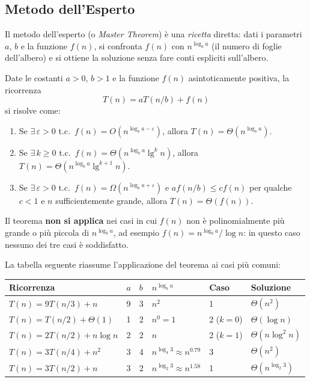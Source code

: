 \subsection{Metodo dell'Esperto}

\begin{softnote}
	Il metodo dell'esperto (o \emph{Master Theorem}) è una \emph{ricetta} diretta: dati i parametri
	$a$, $b$ e la funzione $f(n)$, si confronta $f(n)$ con $n^{\log_b a}$ (il numero di foglie dell'albero)
	e si ottiene la soluzione senza fare conti espliciti sull'albero.
\end{softnote}

\begin{teorema}
	Date le costanti $a > 0$, $b > 1$ e la funzione $f(n)$ asintoticamente positiva, la ricorrenza
	\[
	T(n) = aT(n/b) + f(n)
	\]
	si risolve come:
	\begin{enumerate}
		\item Se $\exists\,\varepsilon > 0$ t.c.\ $f(n) = O\!\left(n^{\log_b a - \varepsilon}\right)$, allora $T(n) = \Theta(n^{\log_b a})$.
		\item Se $\exists\,k \geq 0$ t.c.\ $f(n) = \Theta\!\left(n^{\log_b a} \lg^k n\right)$, allora $T(n) = \Theta(n^{\log_b a} \lg^{k+1} n)$.
		\item Se $\exists\,\varepsilon > 0$ t.c.\ $f(n) = \Omega\!\left(n^{\log_b a + \varepsilon}\right)$ e $af(n/b) \leq cf(n)$ per qualche $c < 1$ e $n$ sufficientemente grande, allora $T(n) = \Theta(f(n))$.
	\end{enumerate}
\end{teorema}

\begin{hardnote}
	Il teorema \textbf{non si applica} nei casi in cui $f(n)$ non è polinomialmente più grande o più piccola di $n^{\log_b a}$, ad esempio $f(n) = n^{\log_b a} / \log n$: in questo caso nessuno dei tre casi è soddisfatto.
\end{hardnote}

La tabella seguente riassume l'applicazione del teorema ai casi più comuni:

\begin{center}
	\begin{tabular}{llllll}
		\toprule
		\textbf{Ricorrenza} & $a$ & $b$ & $n^{\log_b a}$ & \textbf{Caso} & \textbf{Soluzione} \\
		\midrule
		$T(n) = 9T(n/3) + n$         & 9 & 3 & $n^2$   & 1 & $\Theta(n^2)$          \\
		$T(n) = T(n/2) + \Theta(1)$  & 1 & 2 & $n^0=1$ & 2 ($k=0$) & $\Theta(\log n)$ \\
		$T(n) = 2T(n/2) + n\log n$   & 2 & 2 & $n$     & 2 ($k=1$) & $\Theta(n\log^2 n)$ \\
		$T(n) = 3T(n/4) + n^2$       & 3 & 4 & $n^{\log_4 3} \approx n^{0.79}$ & 3 & $\Theta(n^2)$ \\
		$T(n) = 3T(n/2) + n$         & 3 & 2 & $n^{\log_2 3} \approx n^{1.58}$ & 1 & $\Theta(n^{\log_2 3})$ \\
		\bottomrule
	\end{tabular}
\end{center}

